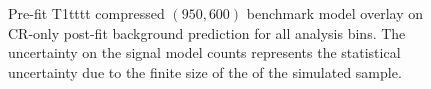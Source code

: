 \begin{figure}[!h]
{        \label{fig:T1tttt_compressed_MR_4j}
    } \\
     ~~
     \\
    \caption{
        Pre-fit T1tttt compressed $(950,600)$ benchmark model overlay on
        CR-only post-fit background prediction for all analysis bins. The
        uncertainty on the signal model counts represents the statistical
        uncertainty due to the finite size of the of the simulated sample.
    }
    \label{fig:T1tttt_compressed_MR}
\end{figure}

